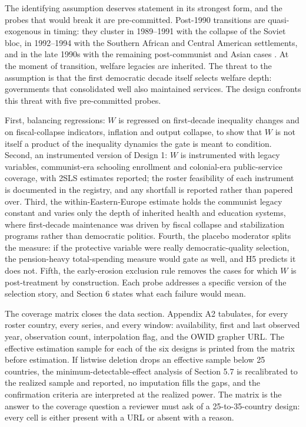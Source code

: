 \documentclass[11pt,letterpaper]{article}
\begin{document}
The identifying assumption deserves statement in its strongest form, and the probes that would break it are pre-committed. Post-1990 transitions are quasi-exogenous in timing: they cluster in 1989--1991 with the collapse of the Soviet bloc, in 1992--1994 with the Southern African and Central American settlements, and in the late 1990s with the remaining post-communist and Asian cases \citep{LuhrmannTannenberg2018}. At the moment of transition, welfare legacies are inherited. The threat to the assumption is that the first democratic decade itself selects welfare depth: governments that consolidated well also maintained services. The design confronts this threat with five pre-committed probes.

First, balancing regressions: $W$ is regressed on first-decade inequality changes and on fiscal-collapse indicators, inflation and output collapse, to show that $W$ is not itself a product of the inequality dynamics the gate is meant to condition. Second, an instrumented version of Design 1: $W$ is instrumented with legacy variables, communist-era schooling enrollment and colonial-era public-service coverage, with 2SLS estimates reported; the roster feasibility of each instrument is documented in the registry, and any shortfall is reported rather than papered over. Third, the within-Eastern-Europe estimate holds the communist legacy constant and varies only the depth of inherited health and education systems, where first-decade maintenance was driven by fiscal collapse and stabilization programs rather than democratic politics. Fourth, the placebo moderator splits the measure: if the protective variable were really democratic-quality selection, the pension-heavy total-spending measure would gate as well, and H5 predicts it does not. Fifth, the early-erosion exclusion rule removes the cases for which $W$ is post-treatment by construction. Each probe addresses a specific version of the selection story, and Section 6 states what each failure would mean.

The coverage matrix closes the data section. Appendix A2 tabulates, for every roster country, every series, and every window: availability, first and last observed year, observation count, interpolation flag, and the OWID grapher URL. The effective estimation sample for each of the six designs is printed from the matrix before estimation. If listwise deletion drops an effective sample below 25 countries, the minimum-detectable-effect analysis of Section 5.7 is recalibrated to the realized sample and reported, no imputation fills the gaps, and the confirmation criteria are interpreted at the realized power. The matrix is the answer to the coverage question a reviewer must ask of a 25-to-35-country design: every cell is either present with a URL or absent with a reason.
\end{document}
